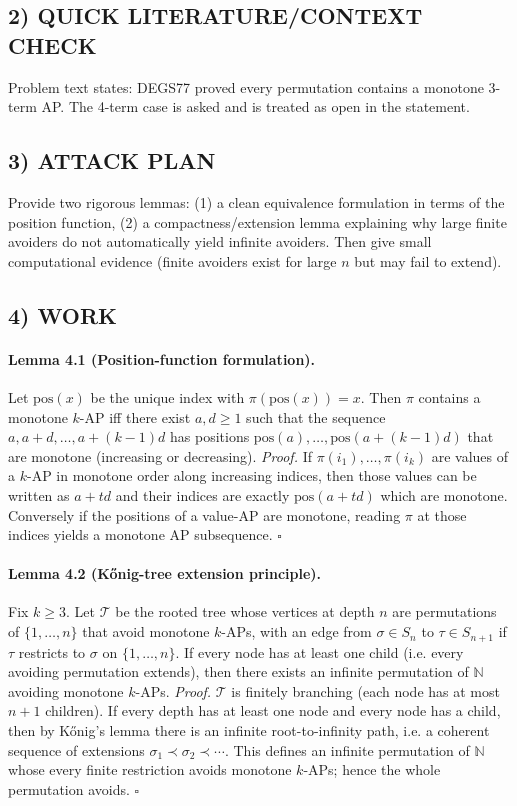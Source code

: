 \subsection*{2) QUICK LITERATURE/CONTEXT CHECK}
Problem text states: DEGS77 proved every permutation contains a monotone 3-term AP. The 4-term case is asked and is treated as open in the statement.

\subsection*{3) ATTACK PLAN}
Provide two rigorous lemmas:
(1) a clean equivalence formulation in terms of the position function,
(2) a compactness/extension lemma explaining why large finite avoiders do not automatically yield infinite avoiders.
Then give small computational evidence (finite avoiders exist for large $n$ but may fail to extend).

\subsection*{4) WORK}

\paragraph{Lemma 4.1 (Position-function formulation).}
Let $\mathrm{pos}(x)$ be the unique index with $\pi(\mathrm{pos}(x))=x$.
Then $\pi$ contains a monotone $k$-AP iff there exist $a,d\ge 1$ such that the sequence
$a,a+d,\dots,a+(k-1)d$ has positions $\mathrm{pos}(a),\dots,\mathrm{pos}(a+(k-1)d)$ that are monotone (increasing or decreasing).
\textit{Proof.}
If $\pi(i_1),\dots,\pi(i_k)$ are values of a $k$-AP in monotone order along increasing indices, then those values can be written as $a+td$ and their indices are
exactly $\mathrm{pos}(a+td)$ which are monotone.
Conversely if the positions of a value-AP are monotone, reading $\pi$ at those indices yields a monotone AP subsequence. \hfill$\square$

\paragraph{Lemma 4.2 (K\H{o}nig-tree extension principle).}
Fix $k\ge 3$. Let $\mathcal{T}$ be the rooted tree whose vertices at depth $n$ are permutations of $\{1,\dots,n\}$ that avoid monotone $k$-APs,
with an edge from $\sigma\in S_n$ to $\tau\in S_{n+1}$ if $\tau$ restricts to $\sigma$ on $\{1,\dots,n\}$.
If every node has at least one child (i.e. every avoiding permutation extends), then there exists an infinite permutation of $\mathbb{N}$ avoiding monotone $k$-APs.
\textit{Proof.}
$\mathcal{T}$ is finitely branching (each node has at most $n+1$ children). If every depth has at least one node and every node has a child,
then by K\H{o}nig’s lemma there is an infinite root-to-infinity path, i.e. a coherent sequence of extensions $\sigma_1\prec\sigma_2\prec\cdots$.
This defines an infinite permutation of $\mathbb{N}$ whose every finite restriction avoids monotone $k$-APs; hence the whole permutation avoids. \hfill$\square$

